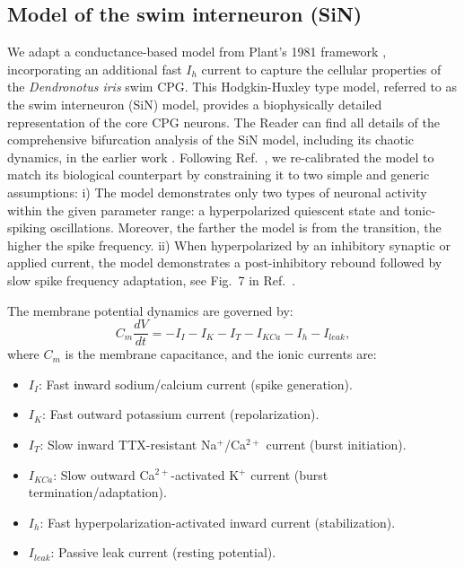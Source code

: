 \documentclass[nofootinbib,aip,amsmath,amssymb,preprint,twocolumn,floatfix,10pt]{revtex4-2}
\begin{document}
\subsection{Model of the swim interneuron (SiN)}
%
We adapt a conductance-based model from Plant's 1981 framework \cite{plant81, scully2024pairing}, incorporating an additional fast $I_h$ current to capture the cellular properties of the \textit{Dendronotus iris} swim CPG. This Hodgkin-Huxley type model, referred to as the swim interneuron (SiN) model, provides a biophysically detailed representation of the core CPG neurons. The Reader can find all details of the comprehensive bifurcation analysis of the SiN model, including its chaotic dynamics, in the earlier work \cite{scully2024chaos}. Following Ref.~\cite{scully2024chaos}, we re-calibrated the model to match its biological counterpart by constraining it to two simple and generic assumptions: i) The model demonstrates only two types of neuronal activity within the given parameter range: a hyperpolarized quiescent state and tonic-spiking oscillations. Moreover, the farther the model is from the transition, the higher the spike frequency. ii) When hyperpolarized by an inhibitory synaptic or applied current, the model demonstrates a post-inhibitory rebound followed by slow spike frequency adaptation, see Fig.~7 in Ref.~\cite{scully2024pairing}.      

The membrane potential dynamics are governed by:
\begin{equation}
C_m \frac{dV}{dt} = -I_{I} - I_K - I_{T} - I_{KCa} - I_h - I_{leak},
\end{equation}
where $C_m$ is the membrane capacitance, and the ionic currents are:
\begin{itemize}
  \item $I_{I}$: Fast inward sodium/calcium current (spike generation).
  \item $I_K$: Fast outward potassium current (repolarization).
  \item $I_{T}$: Slow inward TTX-resistant Na$^+$/Ca$^{2+}$ current (burst initiation).
  \item $I_{KCa}$: Slow outward Ca$^{2+}$-activated K$^+$ current (burst termination/adaptation).
  \item $I_h$: Fast hyperpolarization-activated inward current (stabilization).
  \item $I_{leak}$: Passive leak current (resting potential).
\end{itemize}
\end{document}
